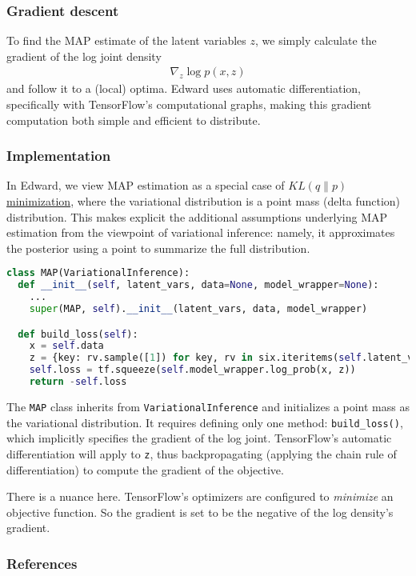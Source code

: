 \subsubsection{Gradient descent}

To find the MAP estimate of the latent variables $z$, we simply
calculate the gradient of the log joint density
\begin{align*}
  \nabla_z
  \log p(x, z)
\end{align*}
and follow it to a (local) optima.
Edward uses automatic differentiation, specifically with TensorFlow's
computational graphs, making this gradient computation both simple and
efficient to distribute.

\subsubsection{Implementation}

In Edward, we view MAP estimation as a special case of
\href{/tutorials/klqp}{$KL(q\|p)$ minimization}, where the variational
distribution is a point mass (delta function) distribution. This makes
explicit the additional assumptions underlying MAP estimation from the
viewpoint of variational inference: namely, it approximates the
posterior using a point to summarize the full distribution.

\begin{lstlisting}[language=Python]
class MAP(VariationalInference):
  def __init__(self, latent_vars, data=None, model_wrapper=None):
    ...
    super(MAP, self).__init__(latent_vars, data, model_wrapper)

  def build_loss(self):
    x = self.data
    z = {key: rv.sample([1]) for key, rv in six.iteritems(self.latent_vars)}
    self.loss = tf.squeeze(self.model_wrapper.log_prob(x, z))
    return -self.loss
\end{lstlisting}

The \texttt{MAP} class inherits from \texttt{VariationalInference} and
initializes a point mass as the variational distribution. It requires
defining only one method:
\texttt{build_loss()}, which implicitly specifies the gradient of the
log joint. TensorFlow's automatic differentiation will apply to
\texttt {z}, thus backpropagating (applying the chain rule of
differentiation) to compute the gradient of the objective.

There is a nuance here. TensorFlow's optimizers are configured to
\emph{minimize} an objective function. So the gradient is set to be
the negative of the log density's gradient.

\subsubsection{References}\label{references}
